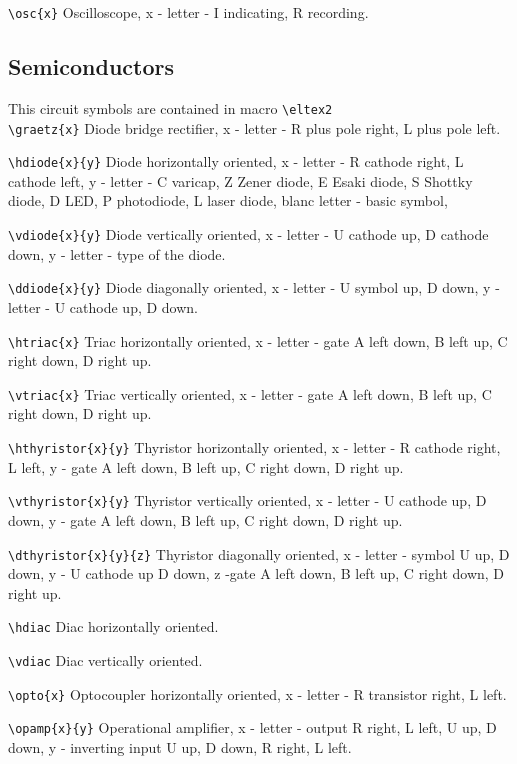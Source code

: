 \noindent
\verb?\osc{x}?
Oscilloscope, x - letter - I  indicating, R recording.

\subsection{Semiconductors}

This circuit symbols are contained in macro \verb?\eltex2? \\

\noindent
\verb?\graetz{x}?
Diode bridge rectifier, x - letter - R plus pole right,
L plus pole left.

\noindent
\verb?\hdiode{x}{y}?
Diode horizontally oriented, x - letter - R cathode right, L
cathode left, y - letter - C varicap, Z Zener diode, E Esaki diode, S
Shottky diode, D LED, P photodiode, L laser diode,
blanc letter - basic symbol,

\noindent
\verb?\vdiode{x}{y}?
Diode vertically oriented, x - letter - U cathode up, D
cathode down, y - letter - type of the diode.

\noindent
\verb?\ddiode{x}{y}?
Diode diagonally oriented, x - letter - U symbol up,
D down, y - letter - U cathode up, D down.


\noindent
\verb?\htriac{x}?
Triac horizontally oriented, x - letter - gate
A left down, B left up, C right down, D right up.


\noindent
\verb?\vtriac{x}?
Triac vertically oriented, x - letter - gate
A left down, B left up, C right down, D right up.


\noindent
\verb?\hthyristor{x}{y}?
Thyristor horizontally oriented, x - letter - R cathode right, L
left, y - gate
A left down, B left up, C right down, D right up.


\noindent
\verb?\vthyristor{x}{y}?
Thyristor vertically oriented, x - letter - U cathode up, D
down, y - gate
A left down, B left up, C right down, D right up.


\noindent
\verb?\dthyristor{x}{y}{z}?
Thyristor diagonally oriented, x - letter - symbol U up,
D down, y - U cathode up D down,
z -gate
A left down, B left up, C right down, D right up.


\noindent
\verb?\hdiac?
Diac horizontally oriented.

\noindent
\verb?\vdiac?
Diac vertically oriented.

\noindent
\verb?\opto{x}?
Optocoupler horizontally oriented, x - letter - R
transistor right, L left.

\noindent
\verb?\opamp{x}{y}?
Operational amplifier, x - letter - output R right, L left,
U up, D down, y - inverting input U up, D down, R
right, L left.

